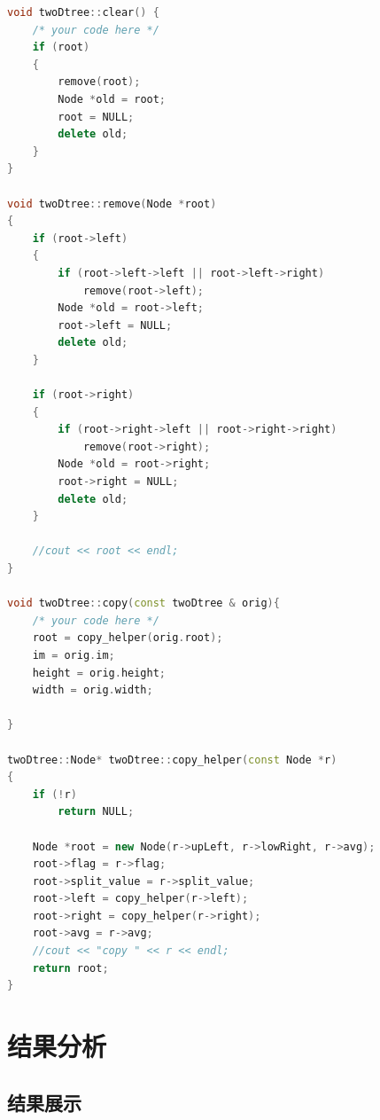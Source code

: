 \documentclass[UTF8]{ctexart}
\begin{document}
\begin{lstlisting}[language=C++,caption={twoDTree.cpp},label={twoDTree.cpp}]
void twoDtree::clear() {
	/* your code here */
    if (root)
    {
        remove(root);
        Node *old = root;
        root = NULL;
        delete old;
    }
}

void twoDtree::remove(Node *root)
{
    if (root->left)
    {
        if (root->left->left || root->left->right)
            remove(root->left);
        Node *old = root->left;
        root->left = NULL;
        delete old;
    }
    
    if (root->right)
    {
        if (root->right->left || root->right->right)
            remove(root->right);
        Node *old = root->right;
        root->right = NULL;
        delete old;
    }

    //cout << root << endl;
}

void twoDtree::copy(const twoDtree & orig){
	/* your code here */
    root = copy_helper(orig.root);
    im = orig.im;
    height = orig.height;
    width = orig.width;

}

twoDtree::Node* twoDtree::copy_helper(const Node *r)
{
    if (!r)
        return NULL;
    
    Node *root = new Node(r->upLeft, r->lowRight, r->avg);
    root->flag = r->flag;
    root->split_value = r->split_value;
    root->left = copy_helper(r->left);
    root->right = copy_helper(r->right);
    root->avg = r->avg;
    //cout << "copy " << r << endl;
    return root;
}

\end{lstlisting}
	\section{结果分析}
	\subsection{结果展示}





\end{document}
